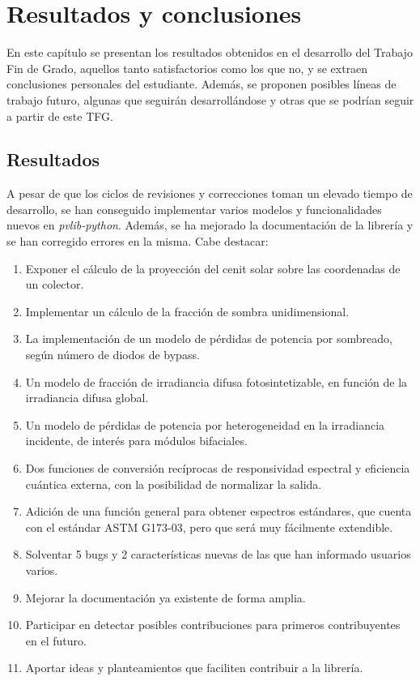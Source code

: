 \chapter{Resultados y conclusiones} \label{chp:resultados}

En este capítulo se presentan los resultados obtenidos en el desarrollo del Trabajo Fin de Grado, aquellos tanto satisfactorios como los que no, y se extraen conclusiones personales del estudiante. Además, se proponen posibles líneas de trabajo futuro, algunas que seguirán desarrollándose y otras que se podrían seguir a partir de este TFG.


\section{Resultados} \label{sct:resultados_resultados}

A pesar de que los ciclos de revisiones y correcciones toman un elevado tiempo de desarrollo, se han conseguido implementar varios modelos y funcionalidades nuevos en \textit{pvlib-python}. Además, se ha mejorado la documentación de la librería y se han corregido errores en la misma. Cabe destacar:

\begin{enumerate}
    \item Exponer el cálculo de la proyección del cenit solar sobre las coordenadas de un colector.
    \item Implementar un cálculo de la fracción de sombra unidimensional.
    \item La implementación de un modelo de pérdidas de potencia por sombreado, según número de diodos de bypass.
    \item Un modelo de fracción de irradiancia difusa fotosintetizable, en función de la irradiancia difusa global.
    \item Un modelo de pérdidas de potencia por heterogeneidad en la irradiancia incidente, de interés para módulos bifaciales.
    \item Dos funciones de conversión recíprocas de responsividad espectral y eficiencia cuántica externa, con la posibilidad de normalizar la salida.
    \item Adición de una función general para obtener espectros estándares, que cuenta con el estándar ASTM G173-03, pero que será muy fácilmente extendible.
    \item Solventar 5 bugs y 2 características nuevas de las que han informado usuarios varios.
    \item Mejorar la documentación ya existente de forma amplia.
    \item Participar en detectar posibles contribuciones para primeros contribuyentes en el futuro.
    \item Aportar ideas y planteamientos que faciliten contribuir a la librería.
\end{enumerate}

